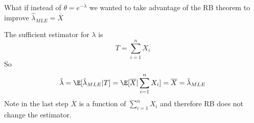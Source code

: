 \documentclass[11pt]{article}
\begin{document}
\begin{example}
  What if instead of $\theta = e^{-\lambda}$ we wanted to take advantage of the RB theorem to improve $\hat{\lambda}_{MLE} = \overline{X}$
  \begin{solution}
    The sufficient estimator for $\lambda$ is
    \[
      T = \sum_{i=1}^n X_i
    \]
    So
    \[
      \hat{\lambda} = \E[\hat{\lambda}_{MLE}|T] = \E[\overline{X}|\sum_{i=1}^n X_i] = \overline{X} = \hat{\lambda}_{MLE}
    \]
    Note in the last step $\overline{X}$ is a function of $\sum_{i=1}^n X_i$ and therefore RB does not change the estimator.
  \end{solution}
\end{example}
\end{document}
